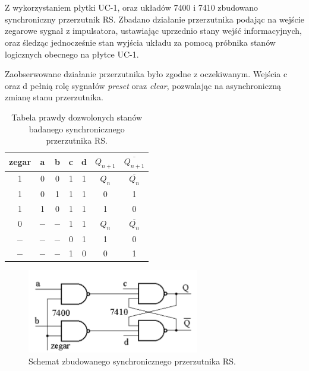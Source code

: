 \section{}
Z wykorzystaniem płytki UC-1, oraz układów 7400 i 7410 zbudowano synchroniczny przerzutnik RS.
Zbadano działanie przerzutnika podając na wejście zegarowe sygnał z impulsatora, ustawiając uprzednio stany wejść informacyjnych, oraz śledząc jednocześnie stan wyjścia układu za pomocą próbnika stanów logicznych obecnego na płytce UC-1.

Zaobserwowane działanie przerzutnika było zgodne z oczekiwanym.
Wejścia c oraz d pełnią rolę sygnałów \textit{preset} oraz \textit{clear}, pozwalając na asynchroniczną zmianę stanu przerzutnika.

\begin{table}[H]
    \centering
    \begin{tabular}{c|c|c|c|c||c|c}
        \hline
        zegar & a     & b     & c & d & \(Q_{n+1}\) & \(\overline{Q_{n+1}}\)
        \\ \hline\hline
        1     & 0     & 0     & 1 & 1 & \(Q_n\)     & \(\overline{Q_n}\)     \\ \hline
        1     & 0     & 1     & 1 & 1 & 0           & 1                      \\ \hline
        1     & 1     & 0     & 1 & 1 & 1           & 0                      \\ \hline
        0     & \(-\) & \(-\) & 1 & 1 & \(Q_n\)     & \(\overline{Q_n}\)     \\ \hline
        \(-\) & \(-\) & \(-\) & 0 & 1 & 1           & 0                      \\ \hline
        \(-\) & \(-\) & \(-\) & 1 & 0 & 0           & 1                      \\ \hline
    \end{tabular}
    \caption{Tabela prawdy dozwolonych stanów badanego synchronicznego przerzutnika RS.}
\end{table}

\begin{figure}[H]
    \centering
    \includegraphics[width=7.5cm]{include/1/1.png}
    \caption{Schemat zbudowanego synchronicznego przerzutnika RS.}
\end{figure}